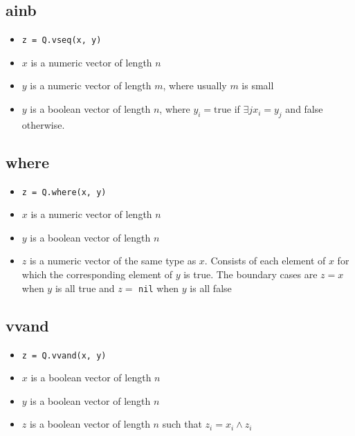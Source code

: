 \subsection{ainb}
\label{ainb}

\begin{itemize}
\item \verb+z = Q.vseq(x, y)+ 
\item \(x\) is a numeric vector of length \(n\)
\item \(y\) is a numeric vector of length \(m\), where usually \(m\) is small
\item \(y\) is a boolean vector of length \(n\), where \(y_i = \mathrm{true}\)
if \(\exists j x_i = y_j\) and false otherwise.
\end{itemize}


\subsection{where}
\label{where}

\begin{itemize}
\item \verb+z = Q.where(x, y)+ 
\item \(x\) is a numeric vector of length \(n\)
\item \(y\) is a boolean vector of length \(n\)
\item \(z\) is a numeric vector of the same type as \(x\). Consists of each
element of \(x\) for which the corresponding element of \(y\) is true. The
boundary cases are \(z = x\) when \(y\) is all true and \(z =\) {\tt nil} when
\(y\) is all false
\end{itemize}

\subsection{vvand}
\label{vvand}

\begin{itemize}
\item \verb+z = Q.vvand(x, y)+ 
\item \(x\) is a boolean vector of length \(n\)
\item \(y\) is a boolean vector of length \(n\)
\item \(z\) is a boolean vector of length \(n\) such that \(z_i = x_i \wedge z_i\)
\end{itemize}

